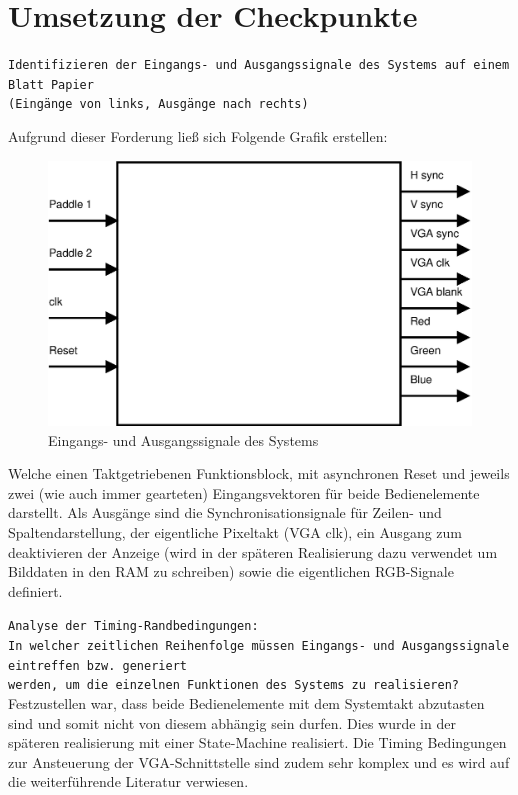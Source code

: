 \documentclass{article}
\begin{document}
\section{Umsetzung der Checkpunkte}
\texttt{Identifizieren der Eingangs- und Ausgangssignale des Systems auf einem Blatt Papier \\ (Eingänge von links, Ausgänge nach rechts)}

Aufgrund dieser Forderung ließ sich Folgende Grafik erstellen:
\begin{figure}[here]
	\begin{center}
		\includegraphics[width=0.65 \textwidth]{includes/TopEntity.eps}
		\caption[Eingangs- und Ausgangssignale des Systems]{Eingangs- und Ausgangssignale des Systems}
		\label{fig:Eingangs- und Ausgangssignale des Systems}
	\end{center}
\end{figure}

\newpage
Welche einen Taktgetriebenen Funktionsblock, mit asynchronen Reset und jeweils zwei (wie auch immer gearteten)
Eingangsvektoren für beide Bedienelemente darstellt. Als Ausgänge sind die Synchronisationsignale für Zeilen- und Spaltendarstellung, 
der eigentliche Pixeltakt (VGA clk), ein Ausgang zum deaktivieren der Anzeige (wird in der späteren Realisierung dazu verwendet um 
Bilddaten in den RAM zu schreiben) sowie die eigentlichen RGB-Signale definiert.
\vspace{7.5mm}

\texttt{Analyse der Timing-Randbedingungen:\\In welcher zeitlichen Reihenfolge müssen Eingangs- und Ausgangssignale
eintreffen bzw. generiert \\ werden, um die einzelnen Funktionen des Systems zu realisieren?}
\newline
Festzustellen war, dass beide Bedienelemente mit dem Systemtakt abzutasten sind und somit nicht von diesem abhängig sein durfen. 
Dies wurde in der späteren realisierung mit einer State-Machine realisiert. Die Timing Bedingungen zur Ansteuerung der VGA-Schnittstelle
sind zudem sehr komplex und es wird auf die weiterführende Literatur verwiesen.\cite{Hamblen}
\vspace{7.5mm}
\end{document}
